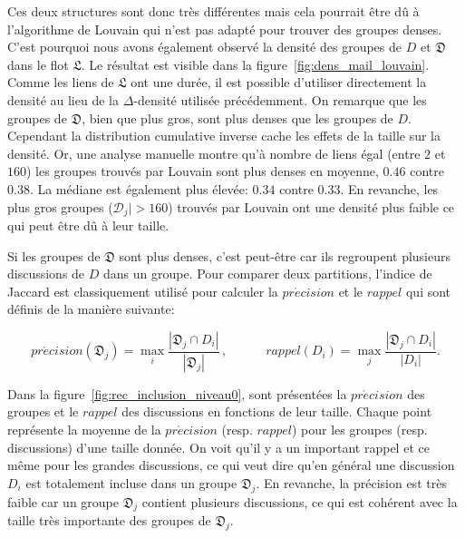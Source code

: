 Ces deux structures sont donc très différentes mais cela pourrait être dû à l'algorithme de Louvain qui n'est pas adapté pour trouver des groupes denses.
C'est pourquoi nous avons également observé la densité des groupes de $D$ et $\mathfrak{D}$ dans le flot $\mathfrak{L}$.
Le résultat est visible dans la figure~\ref{fig:dens_mail_louvain}.
Comme les liens de $\mathfrak{L}$ ont une durée, il est possible d'utiliser directement la densité au lieu de la $\Delta$-densité utilisée précédemment.
On remarque que les groupes de $\mathfrak{D}$, bien que plus gros, sont plus denses que les groupes de $D$.
Cependant la distribution cumulative inverse cache les effets de la taille sur la densité.
Or, une analyse manuelle montre qu'à nombre de liens égal (entre $2$ et $160$) les groupes trouvés par Louvain sont plus denses en moyenne, $0.46$ contre $0.38$. 
La médiane est également plus élevée: $0.34$ contre $0.33$.
En revanche, les plus gros groupes ($\mathcal{D}_j|>160$) trouvés par Louvain ont une densité plus faible ce qui peut être dû à leur taille.

Si les groupes de $\mathfrak{D}$ sont plus denses, c'est peut-être car ils regroupent plusieurs discussions de $D$ dans un groupe.
Pour comparer deux partitions, l'indice de Jaccard est classiquement utilisé pour calculer la $pr\acute{e}cision$ et le $rappel$ qui sont définis de la manière suivante:

\begin{equation*}
pr\acute{e}cision(\mathfrak{D}_j)= \max_{i} \frac{|\mathfrak{D}_j \cap D_i|}{|\mathfrak{D}_j|}\,, \quad \qquad
rappel(D_i)= \max_{j} \frac{|\mathfrak{D}_j \cap D_i|}{|D_i|}.
\label{eq:rappel}
\end{equation*}

Dans la figure~\ref{fig:rec_inclusion_niveau0}, sont présentées la $pr\acute{e}cision$ des groupes et le $rappel$ des discussions en fonctions de leur taille.
Chaque point représente la moyenne de la $pr\acute{e}cision$ (resp. $rappel$) pour les groupes (resp. discussions) d'une taille donnée.
On voit qu'il y a un important rappel et ce même pour les grandes discussions, ce qui veut dire qu'en général une discussion $D_i$ est totalement incluse dans un groupe $\mathfrak{D}_j$.
En revanche, la précision est très faible car un groupe $\mathfrak{D}_j$ contient plusieurs discussions, ce qui est cohérent avec la taille très importante des groupes de $\mathfrak{D}_j$.

